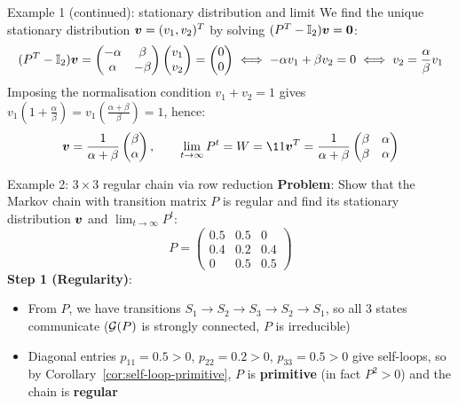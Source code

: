 \documentclass[aspectratio=169]{beamer}\usepackage[]{graphicx}\usepackage[]{xcolor}
\begin{document}
\begin{frame}{Example 1 (continued): stationary distribution and limit}
We find the unique stationary distribution $\bm{v} = (v_1, v_2)^T$ by solving $(P^T - \II_2)\bv = \b0$:
\[
(P^T - \mathbb{I}_2)\bm{v} = \begin{pmatrix} -\alpha & \beta \\ \alpha & -\beta \end{pmatrix} \begin{pmatrix} v_1 \\ v_2 \end{pmatrix} = \begin{pmatrix} 0 \\ 0 \end{pmatrix} \iff -\alpha v_1 + \beta v_2 = 0 \iff v_2 = \frac{\alpha}{\beta} v_1
\]
\vfill
Imposing the normalisation condition $v_1 + v_2 = 1$ gives $v_1\left(1 + \frac{\alpha}{\beta}\right) = v_1\left(\frac{\alpha + \beta}{\beta}\right) = 1$, hence:
\[
\bv = \frac{1}{\alpha + \beta} \begin{pmatrix} \beta \\ \alpha \end{pmatrix},
\qquad
\lim_{t \to \infty} P^t = W = \11\bv^T = \frac{1}{\alpha + \beta} \begin{pmatrix} \beta & \alpha \\ \beta & \alpha \end{pmatrix}
\]
\end{frame}

\begin{frame}{Example 2: $3 \times 3$ regular chain via row reduction}
\textbf{Problem}: Show that the Markov chain with transition matrix $P$ is regular and find its stationary distribution $\bm{v}$ and $\lim_{t \to \infty} P^t$:
\[
P = \begin{pmatrix}
0.5 & 0.5 & 0 \\
0.4 & 0.2 & 0.4 \\
0   & 0.5 & 0.5
\end{pmatrix}
\]
\vfill
\textbf{Step 1 (Regularity)}:
\begin{itemize}
\item From $P$, we have transitions $S_1 \to S_2 \to S_3 \to S_2 \to S_1$, so all 3 states communicate ($\mathcal{G}(P)$ is strongly connected, $P$ is irreducible)
\item Diagonal entries $p_{11} = 0.5 > 0$, $p_{22} = 0.2 > 0$, $p_{33} = 0.5 > 0$ give self-loops, so by Corollary~\ref{cor:self-loop-primitive}, $P$ is \textbf{primitive} (in fact $P^2 > 0$) and the chain is \textbf{regular}
\end{itemize}
\end{frame}
\end{document}

